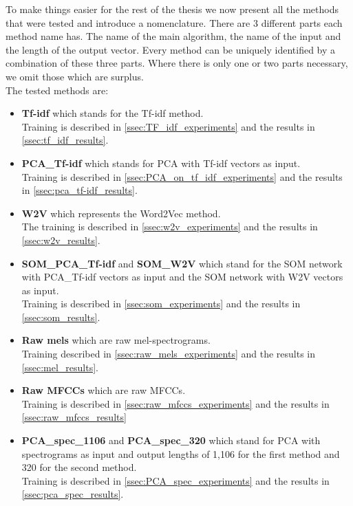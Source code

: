 To make things easier for the rest of the thesis we now present all the methods that were tested and introduce a nomenclature. There are 3 different
parts each method name has. The name of the main algorithm, the name of the 
input and the length of the output vector. Every method can be uniquely 
identified by a combination of these three parts. Where there is only one or
two parts necessary, we omit those which are surplus. \\
The tested methods are:
\renewcommand\labelitemii{\textperiodcentered}
\begin{itemize}
     \item \textbf{Tf-idf} which stands for the Tf-idf method. \\
        Training is described in \ref{ssec:TF_idf_experiments} and the results in \ref{ssec:tf_idf_results}.
    \item \textbf{PCA\_Tf-idf} which stands for PCA with Tf-idf vectors as input. \\
    Training is described in \ref{ssec:PCA_on_tf_idf_experiments} and the results in \ref{ssec:pca_tf-idf_results}.
    \item \textbf{W2V} which represents the Word2Vec method. \\
        The training is described in \ref{ssec:w2v_experiments} and the results in \ref{ssec:w2v_results}.
    \item \textbf{SOM\_PCA\_Tf-idf} and \textbf{SOM\_W2V} which stand for the SOM network with PCA\_Tf-idf vectors as input and the SOM network with W2V vectors as input. \\
            Training is described in \ref{ssec:som_experiments} and the results in \ref{ssec:som_results}.
    \item \textbf{Raw mels} which are raw mel-spectrograms. \\
             Training described in \ref{ssec:raw_mels_experiments} and the results in \ref{ssec:mel_results}.
    \item \textbf{Raw MFCCs} which are raw MFCCs. \\
        Training is described in \ref{ssec:raw_mfccs_experiments} and the results in \ref{ssec:raw_mfccs_results}
    \item \textbf{PCA\_spec\_1106} and \textbf{PCA\_spec\_320} which stand for PCA with spectrograms as input and output lengths of 1,106 for the first method and 320 for the second method. \\
        Training is described in \ref{ssec:PCA_spec_experiments} and the results in \ref{ssec:pca_spec_results}.

\end{itemize}
